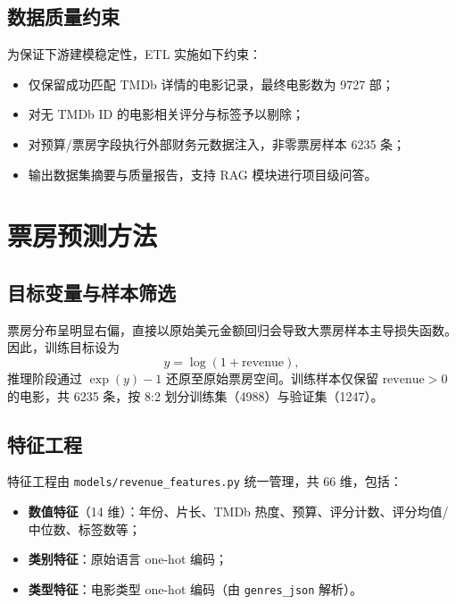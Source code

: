 \subsection{数据质量约束}

为保证下游建模稳定性，ETL 实施如下约束：

\begin{itemize}
    \item 仅保留成功匹配 TMDb 详情的电影记录，最终电影数为 9727 部；
    \item 对无 TMDb ID 的电影相关评分与标签予以剔除；
    \item 对预算/票房字段执行外部财务元数据注入，非零票房样本 6235 条；
    \item 输出数据集摘要与质量报告，支持 RAG 模块进行项目级问答。
\end{itemize}

\section{票房预测方法}
\label{sec:method:revenue}

\subsection{目标变量与样本筛选}

票房分布呈明显右偏，直接以原始美元金额回归会导致大票房样本主导损失函数。因此，训练目标设为
\begin{equation}
    y = \log(1 + \text{revenue}),
    \label{eq:log-target}
\end{equation}
推理阶段通过 $\exp(y)-1$ 还原至原始票房空间。训练样本仅保留 $\text{revenue} > 0$ 的电影，共 6235 条，按 8:2 划分训练集（4988）与验证集（1247）。

\subsection{特征工程}

特征工程由 \texttt{models/revenue\_features.py} 统一管理，共 66 维，包括：

\begin{itemize}
    \item \textbf{数值特征}（14 维）：年份、片长、TMDb 热度、预算、评分计数、评分均值/中位数、标签数等；
    \item \textbf{类别特征}：原始语言 one-hot 编码；
    \item \textbf{类型特征}：电影类型 one-hot 编码（由 \texttt{genres\_json} 解析）。
\end{itemize}

